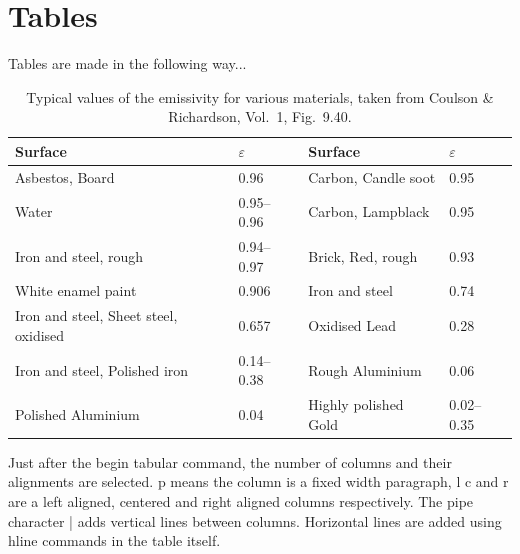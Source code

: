 \documentclass[12pt]{UoAThesis}
\begin{document}
\section{Tables}

Tables are made in the following way...
\begin{table}
  \begin{center}
    \begin{tabular}{|p{4cm}|p{2cm}|||p{4cm}|p{2cm}|}
      Surface & $\varepsilon$ & Surface & $\varepsilon$ 
      \\\hline\hline%
      Asbestos, Board & 0.96 & Carbon, Candle soot & 0.95 \\
      Water & 0.95--0.96 & Carbon, Lampblack & 0.95\\
      Iron and steel, rough & 0.94--0.97 & Brick, Red, rough & 0.93\\
      White enamel paint & 0.906 & Iron and steel & 0.74\\
      Iron and steel, Sheet steel, oxidised & 0.657 & Oxidised Lead  & 0.28\\
      Iron and steel, Polished iron & 0.14--0.38 & Rough Aluminium & 0.06\\
      Polished Aluminium & 0.04 & Highly polished Gold & 0.02--0.35
    \end{tabular}
  \end{center}
  \caption[Typical values of the emissivity for various materials]{
    Typical values of the emissivity for various materials, 
    taken from Coulson \& Richardson, Vol.~1, Fig.~9.40.}
\end{table}

Just after the begin tabular command, the number of columns and their
alignments are selected. p means the column is a fixed width
paragraph, l c and r are a left aligned, centered and right aligned
columns respectively. The pipe character | adds vertical lines between
columns. Horizontal lines are added using hline commands in the table
itself.
\end{document}
